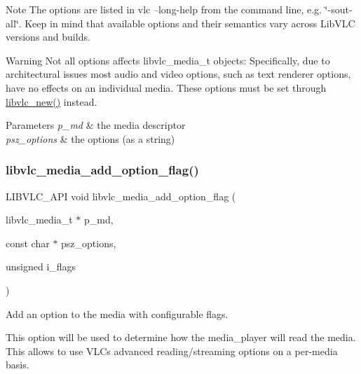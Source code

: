 \begin{DoxyNote}{Note}
The options are listed in \textquotesingle{}vlc --long-\/help\textquotesingle{} from the command line, e.\+g. \char`\"{}-\/sout-\/all\char`\"{}. Keep in mind that available options and their semantics vary across Lib\+V\+LC versions and builds. 
\end{DoxyNote}
\begin{DoxyWarning}{Warning}
Not all options affects libvlc\+\_\+media\+\_\+t objects\+: Specifically, due to architectural issues most audio and video options, such as text renderer options, have no effects on an individual media. These options must be set through \hyperlink{group__libvlc__core_ga1ecba605b37df9e62d2f8c0290ef3893}{libvlc\+\_\+new()} instead.
\end{DoxyWarning}

\begin{DoxyParams}{Parameters}
{\em p\+\_\+md} & the media descriptor \\
\hline
{\em psz\+\_\+options} & the options (as a string) \\
\hline
\end{DoxyParams}
\mbox{\label{group__libvlc__media_ga96d5e0f418eecf74149057796160fd3a}} 
\subsubsection{\texorpdfstring{libvlc\+\_\+media\+\_\+add\+\_\+option\+\_\+flag()}{libvlc\_media\_add\_option\_flag()}}
{\footnotesize\ttfamily L\+I\+B\+V\+L\+C\+\_\+\+A\+PI void libvlc\+\_\+media\+\_\+add\+\_\+option\+\_\+flag (\begin{DoxyParamCaption}\item[{libvlc\+\_\+media\+\_\+t $\ast$}]{p\+\_\+md,  }\item[{const char $\ast$}]{psz\+\_\+options,  }\item[{unsigned}]{i\+\_\+flags }\end{DoxyParamCaption})}

Add an option to the media with configurable flags.

This option will be used to determine how the media\+\_\+player will read the media. This allows to use V\+LC\textquotesingle{}s advanced reading/streaming options on a per-\/media basis.

